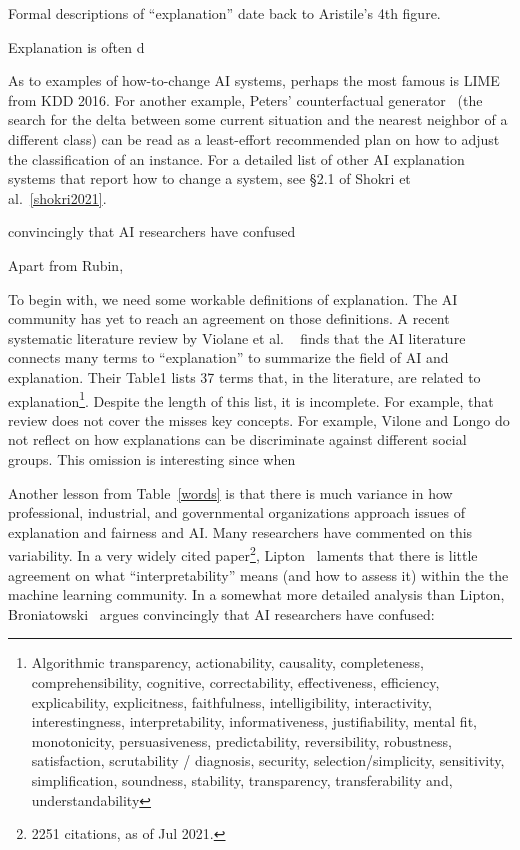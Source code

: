 Formal  descriptions of ``explanation'' date back to Aristile's 4th figure. 


Explanation is often d
 
 As to examples of how-to-change AI systems, perhaps the most famous is LIME~\cite{ribeiro2016should}
 from KDD 2016.
 For another example, Peters'
 counterfactual generator~\cite{peters2015lace2} (the search for the delta between some current situation and the nearest
 neighbor of a different class) can be read as a least-effort
 recommended plan  on how to adjust the classification 
 of an instance. For a detailed list of other AI explanation systems that report how to change a system, see {\S}2.1 of Shokri et al.~\ref{shokri2021}.

  
  
 convincingly that AI researchers have confused 
 
Apart from Rubin, 
 
 
 To begin with, we need some workable definitions of explanation. The AI community has yet to reach an agreement on those definitions.
A recent systematic literature review by Violane et al. ~\cite{vilone2020explainable} finds that the AI literature connects many terms to ``explanation'' to summarize the field of AI and explanation.
Their Table1 lists 37 terms that, in the literature, are related to explanation\footnote{
Algorithmic transparency, 
actionability, 
causality, 
completeness, 
comprehensibility, 
cognitive, 
correctability, 
effectiveness, 
efficiency, 
explicability, 
explicitness, 
faithfulness, 
intelligibility, 
interactivity, 
interestingness, 
interpretability, 
informativeness, 
justifiability, 
mental fit, 
monotonicity, 
persuasiveness, 
predictability, 
reversibility, 
robustness, 
satisfaction, 
scrutability / diagnosis, 
security, 
selection/simplicity, 
sensitivity, 
simplification, 
soundness, 
stability, 
transparency, 
transferability and, 
understandability}. Despite the length of this list, it is incomplete. For example,
that review does not cover the 
misses key concepts.
For example, 
 Vilone and Longo   do not reflect on
how explanations can be discriminate against different social groups. This omission is interesting
since when 
  



Another lesson from  Table~\ref{words} is that there is much variance in how
professional, industrial, and
governmental organizations approach issues of explanation and fairness and AI.
 Many researchers have commented on this
variability.
In  a very widely cited paper\footnote{2251 citations, as of Jul 2021.}, 
Lipton~\cite{lipton2018mythos} laments that there is little
agreement on what   
  ``interpretability'' means
  (and how to assess it) within the
 the machine learning community. 
 In a somewhat more detailed analysis than Lipton,
 Broniatowski~\cite{Broniatowski21} argues
 convincingly that AI researchers have confused:

